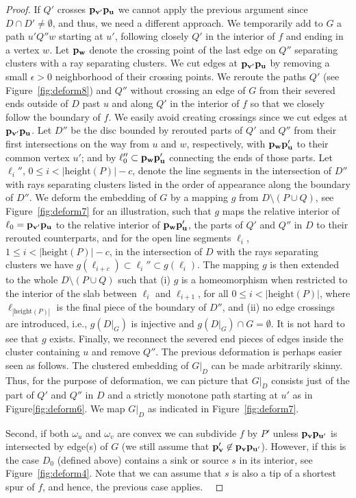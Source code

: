 \documentclass{llncs}
\def\qed{ \ \vrule width.2cm height.2cm depth0cm\smallskip}
\def\length{\mathrm{height}}
\begin{document}
\begin{proof}
If $Q'$ crosses ${\bf p_{v'}p_u}$ we cannot apply the previous argument since $D \cap D' \not=\emptyset$,
and thus, we need a different approach.
We temporarily add to $G$ a path $u'Q''w$ starting at $u'$, following closely $Q'$ in the interior of $f$
and ending in a vertex $w$. Let ${\bf p_w}$ denote the crossing point of the last edge on $Q''$
separating clusters with a ray separating clusters. 
We cut edges at ${\bf p_{v'}p_u}$ by removing a small $\epsilon>0$ neighborhood of their crossing points.
We reroute the paths $Q'$  (see Figure~\ref{fig:deform8}) and $Q''$ without crossing an edge of $G$ from their severed ends outside of $D$ past $u$ and along $Q'$ in the interior of $f$ so that we closely follow the boundary of $f$.
We  easily avoid creating crossings since we cut edges at ${\bf p_{v'}p_u}$.
Let $D''$  be the disc bounded by rerouted parts of $Q'$ and $Q''$ from their first intersections on the way from $u$ and $w$, respectively, with ${\bf p_wp_{u}'}$ to their common vertex $u'$; and by $\ell_0''\subset {\bf p_wp_{u}'}$ connecting the ends of those parts.
Let $\ell_i''$, $0\leq i < |\length(P)|-c$, denote the line segments in the intersection of $D''$ with rays separating clusters listed in the order of appearance along the boundary of $D''$.
We deform the embedding of $G$ by a mapping $g$ from $D\setminus (P \cup Q)$, see Figure~\ref{fig:deform7} for an illustration, such that $g$ maps the relative interior of $\ell_0={\bf p_{v'}p_u}$ to the relative interior of  ${\bf p_wp_{u}'}$, the parts of $Q'$ and $Q''$ in $D$ to their rerouted counterparts, and for the open line segments $\ell_i$, $1\leq i <|\length(P)|-c$, in the intersection of $D$ with the rays separating clusters we have $g(\ell_{i+c})\subset \ell_i'' \subset g(\ell_i)$.
The mapping $g$ is then extended to the whole $D\setminus (P \cup Q)$ such that (i) $g$ is a homeomorphism when restricted to the interior
of the slab between $\ell_i$ and $\ell_{i+1}$, for all $0\le i<|\length(P)|$, where $\ell_{|\length(P)|}$ is the 
final piece of the boundary of $D''$, and (ii) no edge crossings are introduced, i.e., $g(D|_{G})$ is injective
and $g(D|_{G}) \cap G =\emptyset$. It is not hard to see that $g$ exists. Finally, we reconnect the severed end pieces of edges inside the cluster
containing $u$ and remove $Q''$.
The previous deformation is perhaps easier seen as follows. The clustered embedding of $G|_{D}$ can be made  arbitrarily skinny. Thus, for the purpose of  deformation, we can picture that $G|_{D}$ consists just of the part of $Q'$ and $Q''$ in $D$ and a strictly monotone 
path starting at  $u'$ as in Figure\ref{fig:deform6}. We map $G|_{D}$ as indicated in Figure~\ref{fig:deform7}.
 
   
Second, if both $\omega_u$ and $\omega_v$ are convex we can subdivide $f$ by $P'$ unless ${\bf p_{v}p_{u'}}$ is intersected by edge(s) of $G$ (we still assume that  ${\bf p_v'}\not\in{\bf p_{v}p_{u'}}$).
   However, if this is the case $D_0$ (defined above) contains a sink or source $s$ in its interior, see Figure~\ref{fig:deform4}. Note that we can assume that $s$ is also a tip of a shortest spur of $f$, and hence, the previous case applies.\fi
\qed\end{proof}
\end{document}
